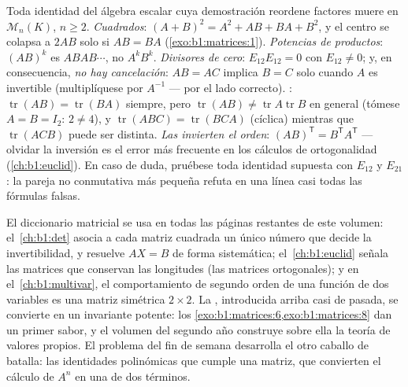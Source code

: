 \begin{remark}
\label{rem:b1:matrices:pitfalls}
Toda identidad del álgebra escalar cuya demostración reordene
factores muere en $\mathcal{M}_n(K)$, $n \geq 2$.
\emph{Cuadrados}: $(A + B)^2 = A^2 + AB + BA + B^2$, y el centro se
colapsa a $2AB$ solo si $AB = BA$ (\cref{exo:b1:matrices:1}).
\emph{Potencias de productos}: $(AB)^k$ es $ABAB\cdots$, no
$A^kB^k$.
\emph{Divisores de cero}: $E_{12}E_{12} = 0$ con $E_{12} \neq 0$; y,
en consecuencia, \emph{no hay cancelación}: $AB = AC$ implica $B = C$
solo cuando $A$ es invertible (multiplíquese por $A^{-1}$ --- por el
lado correcto).
\emph{}: $\operatorname{tr}(AB) = \operatorname{tr}(BA)$
siempre, pero $\operatorname{tr}(AB) \neq
\operatorname{tr}A\operatorname{tr}B$ en general (tómese
$A = B = I_2$: $2 \neq 4$), y $\operatorname{tr}(ABC) =
\operatorname{tr}(BCA)$ (cíclica) mientras que
$\operatorname{tr}(ACB)$ puede ser distinta.
\emph{Las  invierten el orden}: $(AB)^{\mathsf T} =
B^{\mathsf T}A^{\mathsf T}$ --- olvidar la inversión es el error más
frecuente en los cálculos de ortogonalidad (\cref{ch:b1:euclid}).
En caso de duda, pruébese toda identidad supuesta con $E_{12}$ y
$E_{21}$: la pareja no conmutativa más pequeña refuta en una línea
casi todas las fórmulas falsas.
\end{remark}

\begin{remark}
\label{rem:b1:matrices:whereused}
El diccionario matricial se usa en todas las páginas restantes de
este volumen: el~\cref{ch:b1:det} asocia a cada matriz cuadrada un
único número que decide la invertibilidad, y resuelve $AX = B$ de
forma sistemática; el~\cref{ch:b1:euclid} señala las matrices que
conservan las longitudes (las matrices ortogonales); y en
el~\cref{ch:b1:multivar}, el comportamiento de segundo orden de una
función de dos variables es una matriz simétrica $2 \times 2$. La
, introducida arriba casi de pasada, se convierte en un
invariante potente: los \cref{exo:b1:matrices:6,exo:b1:matrices:8}
dan un primer sabor, y el volumen del segundo año construye sobre
ella la teoría de valores propios. El problema del fin de semana
desarrolla el otro caballo de batalla: las identidades polinómicas
que cumple una matriz, que convierten el cálculo de $A^n$ en una
 de dos términos.
\end{remark}

